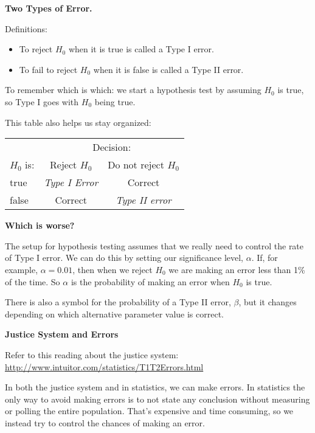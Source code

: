 {\bf Two Types of Error. }

Definitions:\vspace{-.6cm}
\begin{itemize}
  \item To reject $H_0$ when it is true is called a Type I error.
  \item To fail to reject $H_0$ when it is false is called a Type II error.
\vspace{-.6cm}
\end{itemize}
To remember which is which: we start a hypothesis test by assuming
$H_0$ is true, so Type I goes with $H_0$ being true. 

This table also helps us stay organized: \hfill
\begin{tabular}{|l|c|c|}\hline
   & \multicolumn{2}{|c|}{Decision:} \\
$H_0$ is:  & Reject $H_0$ & Do not reject $H_0$\\\hline
true & {\em Type I Error} & Correct  \\ \hline
false& Correct & {\em Type II error}   \\ \hline\hline
\end{tabular}



{\bf Which is worse?}

The setup for hypothesis testing assumes that we really need to
control the rate of Type I error.  We can do this by setting our
 significance level, $\alpha$.  If, for example, $\alpha = 0.01$, then
 when we reject $H_0$ we are making an error less than 1\% of the time.
So $\alpha$ is the probability of making an error when $H_0$ is true.

There is also a symbol for the probability of a Type II error,
$\beta$, but it changes depending on which alternative parameter
value is correct. 



\begin{center}
  {\bf Justice System and Errors }
\end{center}

Refer to this reading about the justice system:\\
\url{http://www.intuitor.com/statistics/T1T2Errors.html}  

In both the justice system and in statistics, we can make errors. In
statistics the only way to avoid making errors is to not state any
conclusion without measuring or polling the entire population.  That's
expensive and time consuming, so we instead try to control the chances
of making an error.  
 

